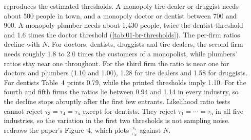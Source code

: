  reproduces the estimated thresholds. A monopoly tire dealer or druggist needs about
500 people in town, and a monopoly doctor or dentist between 700 and 900. A monopoly plumber needs about
1,430 people, twice the dentist threshold and 1.6 times the doctor threshold (\cref{tab:01-br-thresholds}).
The per-firm ratios decline with $N$. For doctors, dentists, druggists and tire dealers, the second firm needs
roughly 1.8 to 2.0 times the customers of a monopolist, while plumbers' ratios stay near one throughout.
For the third firm the ratio is near one for doctors and plumbers (1.10 and 1.00), 1.28 for tire dealers and
1.58 for druggists. For dentists Table~4 prints 0.79, while the printed thresholds imply 1.10.
For the fourth and fifth firms the ratios lie between 0.94 and 1.14 in every industry, so the decline stops
abruptly after the first few entrants.
Likelihood ratio tests cannot reject $\tau_3 = \tau_4 = \tau_5$ except for dentists. They reject
$\tau_1 = \cdots = \tau_5$ in all five industries, so the variation in the first two thresholds is not
sampling noise.  redraws the paper's Figure~4, which plots $\frac{\tau_5}{\tau_N}$
against $N$.

